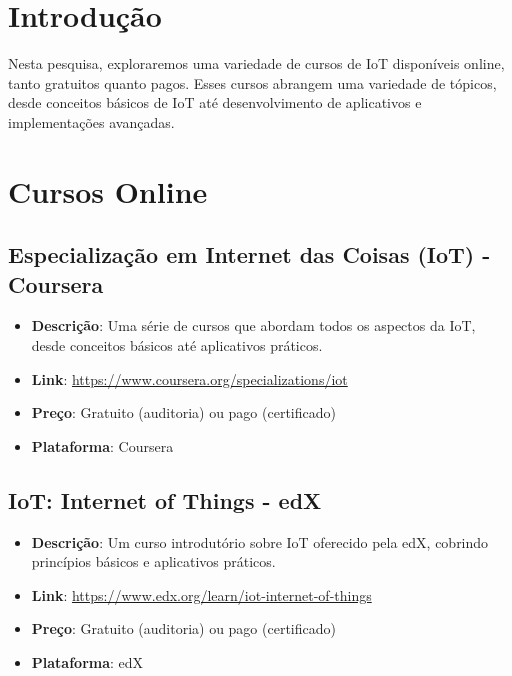 \documentclass{ufersa}
\begin{document}
\maketitle

\tableofcontents

\section{Introdução}
Nesta pesquisa, exploraremos uma variedade de cursos de IoT disponíveis online, tanto gratuitos quanto pagos. Esses cursos abrangem uma variedade de tópicos, desde conceitos básicos de IoT até desenvolvimento de aplicativos e implementações avançadas.

\section{Cursos Online}

\subsection{Especialização em Internet das Coisas (IoT) - Coursera}
\begin{itemize}
    \item \textbf{Descrição}: Uma série de cursos que abordam todos os aspectos da IoT, desde conceitos básicos até aplicativos práticos.
    \item \textbf{Link}: \url{https://www.coursera.org/specializations/iot}
    \item \textbf{Preço}: Gratuito (auditoria) ou pago (certificado)
    \item \textbf{Plataforma}: Coursera
\end{itemize}

\subsection{IoT: Internet of Things - edX}
\begin{itemize}
    \item \textbf{Descrição}: Um curso introdutório sobre IoT oferecido pela edX, cobrindo princípios básicos e aplicativos práticos.
    \item \textbf{Link}: \url{https://www.edx.org/learn/iot-internet-of-things}
    \item \textbf{Preço}: Gratuito (auditoria) ou pago (certificado)
    \item \textbf{Plataforma}: edX
\end{itemize}
\end{document}
